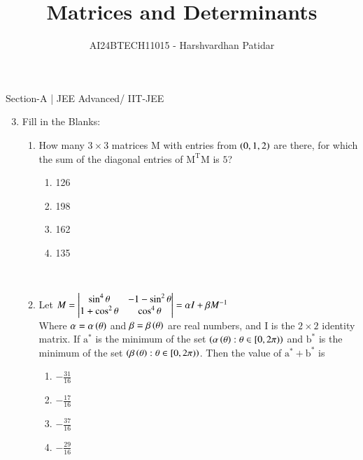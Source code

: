 \documentclass[journal,12pt,twocolumn]{IEEEtran}
\theoremstyle{remark}
\begin{document}

\vspace{3cm}

\title{Matrices and Determinants}
\author{AI24BTECH11015 - Harshvardhan Patidar}
\maketitle
\newpage
\bigskip

\renewcommand{\thefigure}{\theenumi}
\renewcommand{\thetable}{\theenumi}



Section-A | JEE Advanced/ IIT-JEE
 
\begin{enumerate} \setcounter{enumi}{2}
	\item
		Fill in the Blanks:
			\begin{enumerate} 
				\item
					How many $3 \times 3$ matrices M with entries from $\left(0,1,2\right)$ are there, for which the sum of the diagonal entries of $\mathrm{M^TM}$ is $5$?
						\begin{enumerate}
							\item 126
							\item 198
							\item 162
							\item 135
						\end{enumerate}
						\hfill {}\\
				\item
					Let $M= \begin{vmatrix}
						\sin^4 \theta & -1 -\sin^2 \theta\\
						1+\cos^2 \theta & \cos^4 \theta
						\end{vmatrix} = 
						\alpha I + \beta M^{-1}$\\
					Where $\alpha = \alpha \left(\theta\right)$ and $\beta = \beta \left(\theta\right)$ are real numbers, and I is the $2 \times 2$ identity matrix. If $\mathrm{a^*}$ is the minimum of the set $\left(\alpha \left(\theta\right) : \theta \in [0, 2 \pi)\right)$ and $\mathrm{b^*}$ is the minimum of the set $\left(\beta \left(\theta\right) : \theta \in [0, 2 \pi)\right)$. Then the value of $\mathrm{a^*} + \mathrm{b^*}$ is
						\begin{enumerate}
							\item $-\frac{31}{16}$
							\item $-\frac{17}{16}$
							\item $-\frac{37}{16}$
							\item $-\frac{29}{16}$
						\end{enumerate}
						\hfill {}\\
			\end{enumerate}


\end{enumerate}
\end{document}
